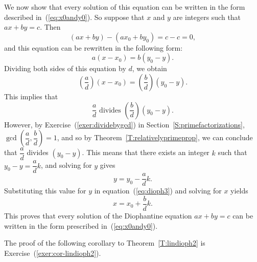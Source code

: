 \begin{myproof}
We now show that every solution of this equation can be written in the form described in~(\ref{eq:x0andy0}).  So suppose that $x$ and $y$ are integers such that $ax + by = c$.  Then
\[
( {ax + by} ) - ( {ax_0 + by_0} ) = c - c = 0,
\]
and this equation can be rewritten in the following form:
\begin{equation}
a( {x - x_0} ) = b( {y_0 - y} ). \label{eq:dioph3}
\end{equation}
Dividing both sides of this equation by $d$, we obtain
\[
\left( \frac{a}{d} \right) \left( {x - x_0} \right ) = \left( \frac{b}{d} \right) \left( {y_0 - y} \right).
\]
This implies that 
\[
\frac{a}{d} \text{ divides } \left( \frac{b}{d} \right) ( {y_0 - y} ).
\]
However, by Exercise~(\ref{exer:dividebygcd})  in Section~\ref{S:primefactorizations}, 
$\gcd \!\left( \dfrac{a}{d}, \dfrac{b}{d} \right) = 1$, and so by 
Theorem~\ref{T:relativelyprimeprop}, we can conclude that 
$\dfrac{a}{d}$ divides  $\left( {y_0 - y} \right)$.  This means that there exists an integer $k$ such that $y_0 - y = \dfrac{a}{d} k$, and solving for $y$ gives
\[
y = y_0 - \frac{a}{d} k.
\]
Substituting this value for $y$ in equation~(\ref{eq:dioph3}) and solving for $x$ yields
\[
x = x_0 + \frac{b}{d} k.
\]
This proves that every solution of the Diophantine equation $ax + by = c$ can be written in the form prescribed  in~(\ref{eq:x0andy0}).
\end{myproof}
%
\noindent
The proof of the following corollary to Theorem~\ref{T:lindioph2} is 
Exercise~(\ref{exer:cor-lindioph2}).

